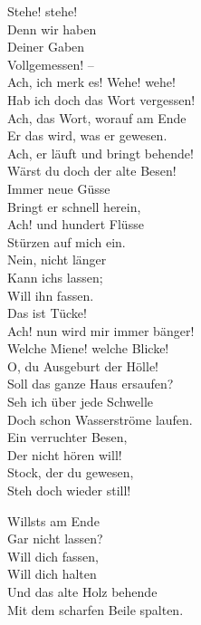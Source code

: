 {    Stehe! stehe! \\
    Denn wir haben \\
    Deiner Gaben \\
    Vollgemessen! – \\
    Ach, ich merk es! Wehe! wehe! \\
    Hab ich doch das Wort vergessen! \\

    Ach, das Wort, worauf am Ende \\
    Er das wird, was er gewesen. \\
    Ach, er läuft und bringt behende! \\
    Wärst du doch der alte Besen! \\
    Immer neue Güsse \\
    Bringt er schnell herein, \\
    Ach! und hundert Flüsse \\
    Stürzen auf mich ein.\\

    Nein, nicht länger \\
    Kann ichs lassen; \\
    Will ihn fassen. \\
    Das ist Tücke! \\
    Ach! nun wird mir immer bänger! \\
    Welche Miene! welche Blicke! \\

    O, du Ausgeburt der Hölle! \\
    Soll das ganze Haus ersaufen? \\
    Seh ich über jede Schwelle \\
    Doch schon Wasserströme laufen. \\
    Ein verruchter Besen, \\
    Der nicht hören will! \\
    Stock, der du gewesen, \\
    Steh doch wieder still! \\

    \vfill
    \columnbreak

    Willsts am Ende \\
    Gar nicht lassen? \\
    Will dich fassen, \\
    Will dich halten \\
    Und das alte Holz behende \\
    Mit dem scharfen Beile spalten. \\

}
